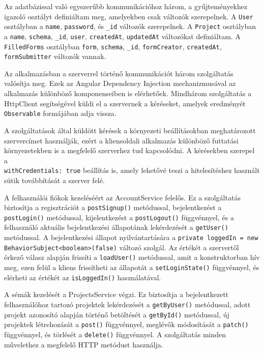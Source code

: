 Az adatbázissal való egyszerűbb kommunikációhoz három, a gyűjteményekhez igazoló osztályt definiáltam meg, amelyekben csak változók szerepelnek. A \texttt{User} osztályban a \texttt{name}, \texttt{password}, és \texttt{\_id} változók szerepelnek. A \texttt{Project} osztályban a \texttt{name}, \texttt{schema}, \texttt{\_id}, \texttt{user}, \texttt{createdAt}, \texttt{updatedAt} változókat definiáltam. A \texttt{FilledForms} osztályban \texttt{form}, \texttt{schema}, \texttt{\_id}, \texttt{formCreator}, \texttt{createdAt}, \texttt{formSubmitter} változók vannak. 


Az alkalmazásban a szerverrel történő kommunikációt három szolgáltatás valósítja meg. Ezek az Angular Dependency Injection mechanizmusával az alkalmazás különböző komponenseiben is elérhetőek. Mindhárom szolgáltatás a HttpClient segítségével küldi el a szervernek a kéréseket, amelyek eredményét \texttt{Observable} formájában adja vissza.

A szolgáltatások által küldött kérések a környezeti beállításokban meghatározott szervercímet használják, ezért a kliensoldali alkalmazás különböző futtatási környezetekben is a megfelelő szerverhez tud kapcsolódni. A kérésekben szerepel a \\ \texttt{withCredentials: true} beállítás is, amely lehetővé teszi a hitelesítéshez használt sütik továbbítását a szerver felé.

A felhasználói fiókok kezeléséért az AccountService felelős. Ez a szolgáltatás biztosítja a regisztrációt a \texttt{postSignup()} metódussal, bejelentkezést a \texttt{postLogin()} metódussal, kijelentkezést a \texttt{postLogout()} függvénnyel, és a felhasználó aktuális bejelentkezési állapotának lekérdezését a \texttt{getUser()} metódussal. A bejelentkezési állapot nyilvántartására a \texttt{private loggedIn = new BehaviorSubject<boolean>(false)} változó szolgál. Az értékét a szervertől érkező válasz alapján frissíti a \texttt{loadUser()} metódussal, amit a konstruktorban hív meg, ezen felül a kliens frissítheti az állapotát a \texttt{setLoginState()} függvénnyel, és elérheti az értékét az \texttt{isLoggedIn()} használatával. 

A sémák kezelését a ProjectsService végzi. Ez biztosítja a bejelentkezett felhasználóhoz tartozó projektek lekérdezését a \texttt{getByUser()} metódussal, adott projekt azonosító alapján történő betöltését a \texttt{getById()} metódussal, új projektek létrehozását a \texttt{post()} függvénnyel, meglévők módosítását a \texttt{patch()} függvénnyel, és törlését a \texttt{delete()} függvénnyel. A szolgáltatás minden művelethez a megfelelő HTTP metódust használja.

